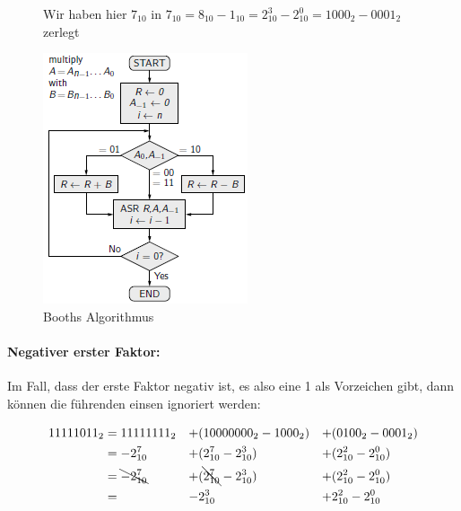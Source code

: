 \documentclass[12pt]{report}
\begin{document}
\begin{figure}[H]
\begin{minipage}[t]{0.6\textwidth}
    Wir haben hier $7_{10}$ in $7_{10} = 8_{10}-1_{10} = 2^3_{10} - 2^0_{10} = 1000_2 - 0001_2$ zerlegt

  \end{minipage}
  \hfill
  \begin{minipage}[t]{0.3\textwidth}
    \caption{Booths Algorithmus}
    \label{fig:booths-multiplikationsalgorithmus}
    \begin{center}
      \includegraphics[width=\textwidth]{booths-multiplikationsalgorithmus}
    \end{center}
  \end{minipage}
\end{figure}

\paragraph{Negativer erster Faktor:}

Im Fall, dass der erste Faktor negativ ist, es also eine 1 als Vorzeichen gibt, dann können die führenden einsen ignoriert werden:

\begin{alignat*}{3}
  11111011_2 
   & = 11111111_2          & + & (10000000_2 - 1000_2)           & + & (0100_2 - 0001_2)     \\
   & = -2^7_{10}           & + & (2^7_{10} - 2^3_{10})           & + & (2^2_{10} - 2^0_{10}) \\
   & = \bcancel{-2^7_{10}} & + & (\bcancel{2^7_{10}} - 2^3_{10}) & + & (2^2_{10} - 2^0_{10}) \\
   & =   \                 & - & 2^3_{10}                        & + & 2^2_{10} - 2^0_{10}
\end{alignat*}
\end{document}
